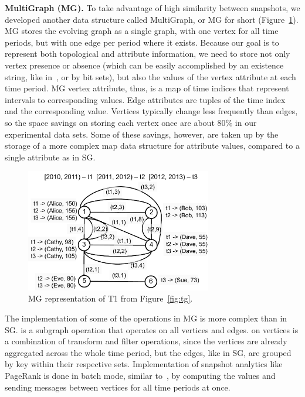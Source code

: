{\bf MultiGraph (MG).}  To take advantage of high similarity between
snapshots, we developed another data structure called MultiGraph, or
MG for short (Figure~\ref{fig:mg}).  MG stores the evolving graph as a
single graph, with one vertex for all time periods, but with one edge
per period where it exists.  Because our goal is to represent both
topological and attribute information, we need to store not only
vertex presence or absence (which can be easily accomplished by an
existence string, like in~\cite{Kan2009}, or by bit sets), but also
the values of the vertex attribute at each time period.  MG vertex
attribute, thus, is a map of time indices that represent intervals to
corresponding values.  Edge attributes are tuples of the time index
and the corresponding value.  Vertices typically change less
frequently than edges, so the space savings on storing each vertex
once are about 80\% in our experimental data sets.  Some of these
savings, however, are taken up by the storage of a more complex map
data structure for attribute values, compared to a single attribute as
in SG.  

\begin{figure}[t!]
\includegraphics[width=3.2in]{figs/mg.pdf}
\caption{MG representation of T1 from Figure~\ref{fig:tg}.}
\label{fig:mg}
\end{figure}

The implementation of some of the \ql operations in MG is more complex
than in SG.   is a subgraph operation that operates on
all vertices and edges.   on vertices is a combination
of transform and filter operations, since the vertices are already
aggregated across the whole time period, but the edges, like in SG,
are grouped by key within their respective sets.  Implementation of
snapshot analytics like PageRank is done in batch mode, similar
to~\cite{DBLP:journals/tos/MiaoHLWYZPCC15}, by computing the values
and sending messages between vertices for all time periods at once.

